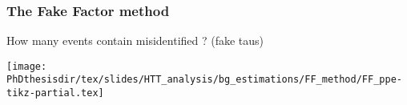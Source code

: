 \begin{frame}
\frametitle{The Fake Factor method}

\manip How many events contain misidentified \tauh? (fake taus)

\pause

\begin{center}
\texttt{[image: \\PhDthesisdir/tex/slides/HTT\_analysis/bg\_estimations/FF\_method/FF\_ppe-tikz-partial.tex]}
\end{center}
\end{frame}



%
%
%
%
%
%
